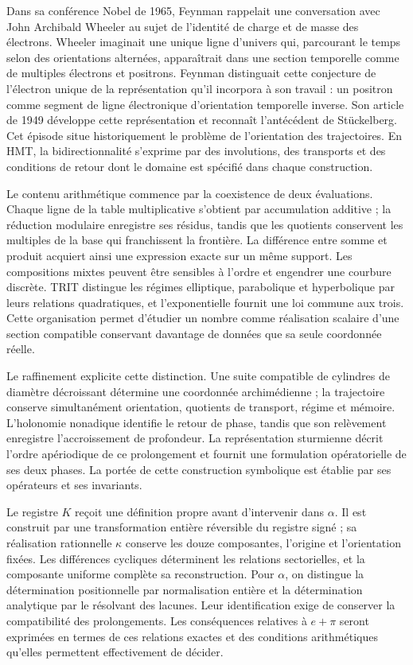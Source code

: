 Dans sa conférence Nobel de 1965, Feynman rappelait une conversation avec
John Archibald Wheeler au sujet de l'identité de charge et de masse des
électrons\cite{feynman1965}. Wheeler imaginait une unique ligne d'univers
qui, parcourant le temps selon des orientations alternées, apparaîtrait dans une
section temporelle comme de multiples électrons et positrons. Feynman distinguait
cette conjecture de l'électron unique de la représentation qu'il incorpora à
son travail : un positron comme segment de ligne électronique d'orientation
temporelle inverse. Son article de 1949 développe cette représentation et
reconnaît l'antécédent de Stückelberg\cite{feynman1949}. Cet épisode
situe historiquement le problème de l'orientation des trajectoires. En HMT,
la bidirectionnalité s'exprime par des involutions, des transports et
des conditions de retour dont le domaine est spécifié dans chaque construction.

Le contenu arithmétique commence par la coexistence de deux évaluations.
Chaque ligne de la table multiplicative s'obtient par accumulation additive ;
la réduction modulaire enregistre ses résidus, tandis que les quotients conservent
les multiples de la base qui franchissent la frontière. La différence entre
somme et produit acquiert ainsi une expression exacte sur un même support.
Les compositions mixtes peuvent être sensibles à l'ordre et engendrer une
courbure discrète. TRIT distingue les régimes elliptique, parabolique et
hyperbolique par leurs relations quadratiques, et l'exponentielle fournit
une loi commune aux trois. Cette organisation permet d'étudier un nombre
comme réalisation scalaire d'une section compatible conservant davantage de données
que sa seule coordonnée réelle.

Le raffinement explicite cette distinction. Une suite compatible de
cylindres de diamètre décroissant détermine une coordonnée archimédienne ;
la trajectoire conserve simultanément orientation, quotients de transport,
régime et mémoire. L'holonomie nonadique identifie le retour de phase,
tandis que son relèvement enregistre l'accroissement de profondeur. La représentation
sturmienne décrit l'ordre apériodique de ce prolongement et fournit
une formulation opératorielle de ses deux phases. La portée de cette construction
symbolique est établie par ses opérateurs et ses invariants.

Le registre \(K\) reçoit une définition propre avant d'intervenir dans
\(\alpha\). Il est construit par une transformation entière réversible du
registre signé ; sa réalisation rationnelle \(\kappa\) conserve les douze
composantes, l'origine et l'orientation fixées. Les différences cycliques
déterminent les relations sectorielles, et la composante uniforme complète
sa reconstruction. Pour \(\alpha\), on distingue la détermination positionnelle
par normalisation entière et la détermination analytique par le résolvant
des lacunes. Leur identification exige de conserver la compatibilité des
prolongements. Les conséquences relatives à \(e+\pi\) seront exprimées en termes
de ces relations exactes et des conditions arithmétiques qu'elles permettent
effectivement de décider.

